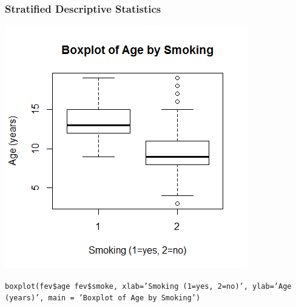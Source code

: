 \documentclass[12pt, 
hyperref={colorlinks=true, linkcolor=blue, urlcolor=cyan}]{beamer}
\begin{document}
\begin{frame}
\frametitle{Stratified Descriptive Statistics}

\vspace{-0.4cm} \center \includegraphics[height=0.6\textheight]{./boxplot-age-stratified}

\begin{scriptsize} \texttt{boxplot(fev\$age~fev\$smoke, xlab='Smoking (1=yes, 2=no)', ylab='Age (years)', main = 'Boxplot of Age by Smoking')} \end{scriptsize}

\end{frame}
\end{document}
